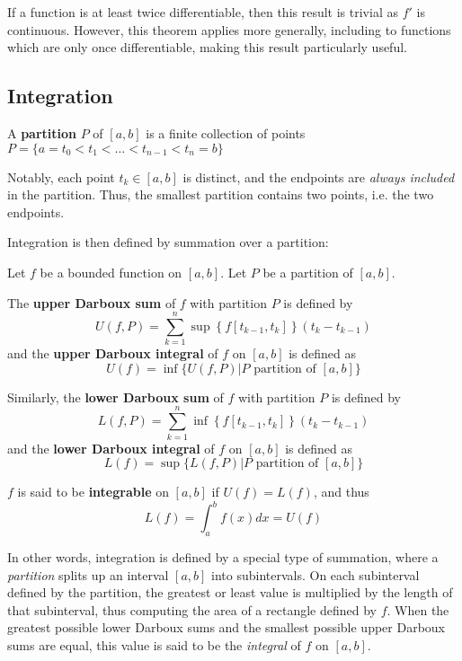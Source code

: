 If a function is at least twice differentiable, then this result is trivial as $f'$ is continuous. However, this theorem applies more generally, including to functions which are only once differentiable, making this result particularly useful.

\newpage

\subsection{Integration} %

\begin{defn}
    A \textbf{partition} $P$ of $[a,b]$ is a finite collection of points $P=\{a=t_0 < t_1 <\dots < t_{n-1}<t_n=b\}$
\end{defn} Notably, each point $t_k\in [a,b]$ is distinct, and the endpoints are \textit{always included} in the partition. Thus, the smallest partition contains two points, i.e. the two endpoints.

Integration is then defined by summation over a partition:
\begin{shaded}
    Let $f$ be a bounded function on $[a,b]$. Let $P$ be a partition of $[a,b]$.
    
    The \textbf{upper Darboux sum} of $f$ with partition $P$ is defined by \[U(f,P) = \sum_{k=1}^n \sup\left\{f[t_{k-1},t_k]\right\}(t_k-t_{k-1})\] and the \textbf{upper Darboux integral} of $f$ on $[a,b]$ is defined as \[U(f) = \inf \{U(f,P)|P\text{ partition of }[a,b]\}\]

    Similarly, the \textbf{lower Darboux sum} of $f$ with partition $P$ is defined by \[L(f,P) = \sum_{k=1}^n \inf \left\{f[t_{k-1},t_k]\right\}(t_k-t_{k-1})\] and the \textbf{lower Darboux integral} of $f$ on $[a,b]$ is defined as \[L(f) = \sup \{L(f,P)|P\text{ partition of }[a,b]\}\]

    $f$ is said to be \textbf{integrable} on $[a,b]$ if $U(f)=L(f)$, and thus \[L(f) = \int_a^b f(x)dx = U(f)\]
\end{shaded}

In other words, integration is defined by a special type of summation, where a \textit{partition} splits up an interval $[a,b]$ into subintervals. On each subinterval defined by the partition, the greatest or least value is multiplied by the length of that subinterval, thus computing the area of a rectangle defined by $f$. When the greatest possible lower Darboux sums and the smallest possible upper Darboux sums are equal, this value is said to be the \textit{integral} of $f$ on $[a,b]$.

